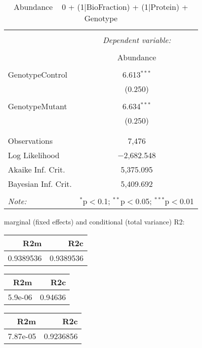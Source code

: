 \documentclass[11pt]{report}
\begin{document}
\begin{table}[!htbp] \centering 
  \caption{Abundance ~ 0 + (1|BioFraction) + (1|Protein) + Genotype} 
  \label{} 
\begin{tabular}{@{\extracolsep{5pt}}lc} 
\\[-1.8ex]\hline 
\hline \\[-1.8ex] 
 & \multicolumn{1}{c}{\textit{Dependent variable:}} \\ 
\cline{2-2} 
\\[-1.8ex] & Abundance \\ 
\hline \\[-1.8ex] 
 GenotypeControl & 6.613$^{***}$ \\ 
  & (0.250) \\ 
  & \\ 
 GenotypeMutant & 6.634$^{***}$ \\ 
  & (0.250) \\ 
  & \\ 
\hline \\[-1.8ex] 
Observations & 7,476 \\ 
Log Likelihood & $-$2,682.548 \\ 
Akaike Inf. Crit. & 5,375.095 \\ 
Bayesian Inf. Crit. & 5,409.692 \\ 
\hline 
\hline \\[-1.8ex] 
\textit{Note:}  & \multicolumn{1}{r}{$^{*}$p$<$0.1; $^{**}$p$<$0.05; $^{***}$p$<$0.01} \\ 
\end{tabular} 
\end{table} 
marginal (fixed effects) and conditional (total variance) R2:

\begin{tabular}{r|r}
\hline
R2m & R2c\\
\hline
0.9389536 & 0.9389536\\
\hline
\end{tabular}

\begin{tabular}{r|r}
\hline
R2m & R2c\\
\hline
5.9e-06 & 0.94636\\
\hline
\end{tabular}

\begin{tabular}{r|r}
\hline
R2m & R2c\\
\hline
7.87e-05 & 0.9236856\\
\hline
\end{tabular}
\end{document}
